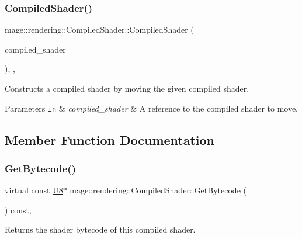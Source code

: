 \subsubsection{\texorpdfstring{Compiled\+Shader()}{CompiledShader()}\hspace{0.1cm}{\footnotesize\ttfamily [3/3]}}
{\footnotesize\ttfamily mage\+::rendering\+::\+Compiled\+Shader\+::\+Compiled\+Shader (\begin{DoxyParamCaption}\item[{\mbox{\hyperlink{classmage_1_1rendering_1_1_compiled_shader}{Compiled\+Shader}} \&\&}]{compiled\+\_\+shader }\end{DoxyParamCaption})\hspace{0.3cm}{\ttfamily [protected]}, {\ttfamily [default]}, {\ttfamily [noexcept]}}

Constructs a compiled shader by moving the given compiled shader.


\begin{DoxyParams}[1]{Parameters}
\mbox{\tt in}  & {\em compiled\+\_\+shader} & A reference to the compiled shader to move. \\
\hline
\end{DoxyParams}


\subsection{Member Function Documentation}
\mbox{\label{classmage_1_1rendering_1_1_compiled_shader_a469367d98fe910537a02868df0c85ec4}} 
\subsubsection{\texorpdfstring{Get\+Bytecode()}{GetBytecode()}}
{\footnotesize\ttfamily virtual const \mbox{\hyperlink{namespacemage_a30677c03d683c4c35630c25f6ff3fb7f}{U8}}$\ast$ mage\+::rendering\+::\+Compiled\+Shader\+::\+Get\+Bytecode (\begin{DoxyParamCaption}{ }\end{DoxyParamCaption}) const\hspace{0.3cm}{\ttfamily [pure virtual]}, {\ttfamily [noexcept]}}

Returns the shader bytecode of this compiled shader.

